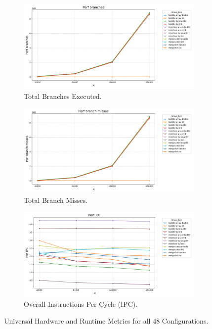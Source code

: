 \documentclass[11pt, a4paper]{article}
\begin{document}
\begin{figure}[h]
    \vspace{0.5cm} %

    \begin{subfigure}[b]{0.32\textwidth}
        \centering
        \includegraphics[width=\textwidth]{plots/_branches.png}
        \caption{Total Branches Executed.}
        \label{fig:app_sub_branches_total}
    \end{subfigure}
    \hfill
    \begin{subfigure}[b]{0.32\textwidth}
        \centering
        \includegraphics[width=\textwidth]{plots/_branch-misses.png}
        \caption{Total Branch Misses.}
        \label{fig:app_sub_branches_misses}
    \end{subfigure}
    \hfill
    \begin{subfigure}[b]{0.32\textwidth}
        \centering
        \includegraphics[width=\textwidth]{plots/_ipc.png}
        \caption{Overall Instructions Per Cycle (IPC).}
        \label{fig:app_sub_ipc}
    \end{subfigure}

    \caption{Universal Hardware and Runtime Metrics for all 48 Configurations.}
    \label{fig:universal_appendix_metrics}
\end{figure}
\end{document}
